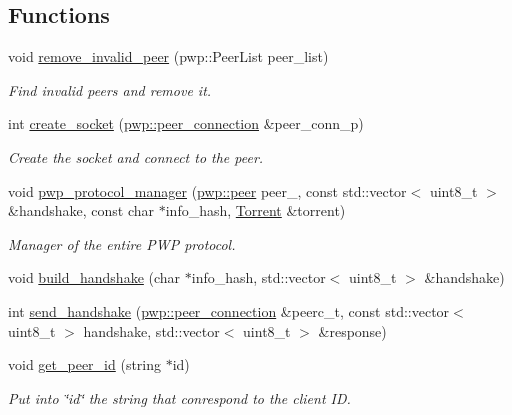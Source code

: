 \subsection*{Functions}
\begin{DoxyCompactItemize}
\item 
void \hyperlink{namespacepwp_ae8331eb5e3c98deddc6022dad92352f6}{remove\+\_\+invalid\+\_\+peer} (pwp\+::\+Peer\+List peer\+\_\+list)
\begin{DoxyCompactList}\small\item\em Find invalid peers and remove it. \end{DoxyCompactList}\item 
int \hyperlink{namespacepwp_a73acf05b954e39825a88036d5793db6b}{create\+\_\+socket} (\hyperlink{structpwp_1_1peer__connection}{pwp\+::peer\+\_\+connection} \&peer\+\_\+conn\+\_\+p)
\begin{DoxyCompactList}\small\item\em Create the socket and connect to the peer. \end{DoxyCompactList}\item 
void \hyperlink{namespacepwp_a62060bdcdc80541b0892e26fbeab1e91}{pwp\+\_\+protocol\+\_\+manager} (\hyperlink{structpwp_1_1peer}{pwp\+::peer} peer\+\_\+, const std\+::vector$<$ uint8\+\_\+t $>$ \&handshake, const char $\ast$info\+\_\+hash, \hyperlink{structTorrent}{Torrent} \&torrent)
\begin{DoxyCompactList}\small\item\em Manager of the entire P\+WP protocol. \end{DoxyCompactList}\item 
void \hyperlink{namespacepwp_a6062876f4d4d4d6ee19341a79a797864}{build\+\_\+handshake} (char $\ast$info\+\_\+hash, std\+::vector$<$ uint8\+\_\+t $>$ \&handshake)
\item 
int \hyperlink{namespacepwp_a851ddc0e8fb2eb0a86317cc944c4a927}{send\+\_\+handshake} (\hyperlink{structpwp_1_1peer__connection}{pwp\+::peer\+\_\+connection} \&peerc\+\_\+t, const std\+::vector$<$ uint8\+\_\+t $>$ handshake, std\+::vector$<$ uint8\+\_\+t $>$ \&response)
\item 
void \hyperlink{namespacepwp_ada6a8613896dbbfd6fba63b17d51684c}{get\+\_\+peer\+\_\+id} (string $\ast$id)
\begin{DoxyCompactList}\small\item\em Put into \char`\"{}id\char`\"{} the string that conrespond to the client ID. \end{DoxyCompactList}\item 

\end{DoxyCompactItemize}
